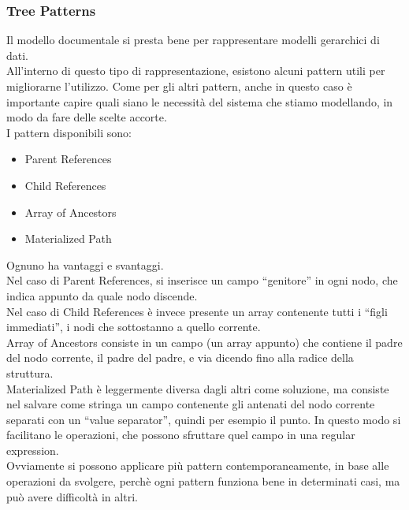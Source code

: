 \subsubsection{Tree Patterns}
Il modello documentale si presta bene per rappresentare modelli gerarchici di dati.\\
All'interno di questo tipo di rappresentazione, esistono alcuni pattern utili per migliorarne l'utilizzo. Come per gli altri pattern, anche in questo caso è importante capire quali siano le necessità del sistema che stiamo modellando, in modo da fare delle scelte accorte.\\
I pattern disponibili sono:
\begin{itemize}
    \item Parent References
    \item Child References
    \item Array of Ancestors
    \item Materialized Path
\end{itemize}
\noindent Ognuno ha vantaggi e svantaggi.\\
Nel caso di Parent References, si inserisce un campo ``genitore'' in ogni nodo, che indica appunto da quale nodo discende.\\
Nel caso di Child References è invece presente un array contenente tutti i ``figli immediati'', i nodi che sottostanno a quello corrente.\\
Array of Ancestors consiste in un campo (un array appunto) che contiene il padre del nodo corrente, il padre del padre, e via dicendo fino alla radice della struttura.\\
Materialized Path è leggermente diversa dagli altri come soluzione, ma consiste nel salvare come stringa un campo contenente gli antenati del nodo corrente separati con un ``value separator'', quindi per esempio il punto. In questo modo si facilitano le operazioni, che possono sfruttare quel campo in una regular expression.\\
Ovviamente si possono applicare più pattern contemporaneamente, in base alle operazioni da svolgere, perchè ogni pattern funziona bene in determinati casi, ma può avere difficoltà in altri.\\


